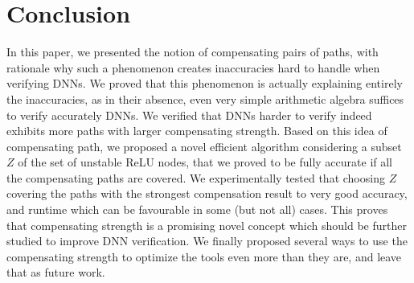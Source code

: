 \documentclass{llncs}
\begin{document}
\section{Conclusion}

In this paper, we presented the notion of compensating pairs of paths, with rationale why such a phenomenon creates inaccuracies hard to handle when verifying DNNs. We proved that this phenomenon is actually explaining entirely the inaccuracies, as in their absence, even very simple arithmetic algebra suffices to verify accurately DNNs. We verified that DNNs harder to verify indeed exhibits more paths with larger compensating strength. 
Based on this idea of compensating path, we proposed a novel efficient algorithm considering a subset $Z$ of the set of unstable ReLU nodes, that we proved to be fully accurate if all the compensating paths are covered. We experimentally tested that choosing $Z$ covering the paths with the strongest compensation result to very good accuracy, and runtime which can be favourable in some (but not all) cases. 
This proves that compensating strength is a promising novel concept which should be further studied to 
improve DNN verification. We finally proposed several ways to use the compensating strength to optimize the tools even more than they are, and leave that as future work.

\newpage




\newpage

\appendix


\end{document}
